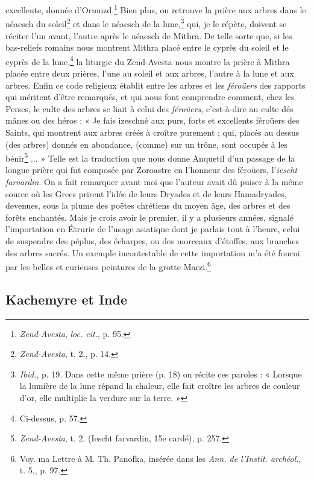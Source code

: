 \documentclass[a4paper, 11pt, oneside, polutonikogreek, french]{article}
\begin{document}
excellente, donnée d'Ormuzd.\footnote{\emph{Zend-Avesta}, \emph{loc. cit.}, p. 95.} Bien plus, on retrouve la prière aux arbres dans le néaesch du soleil\footnote{\emph{Zend-Avesta}, t. 2., p. 14.} et dans le néaesch de la lune,\footnote{\emph{Ibid.}, p. 19. Dans cette même prière (p. 18) on récite ces paroles : « Lorsque la lumière de la lune répand la chaleur, elle fait croître les arbres de couleur d'or, elle multiplie la verdure sur la terre. »} qui, je le répète, doivent se réciter l'un avant, l'autre après le néaesch de Mithra. De telle sorte que, si les bas-reliefs romains nous montrent Mithra placé entre le cyprès du soleil et le cyprès de la lune,\footnote{Ci-dessus, p. 57.} la liturgie du Zend-Avesta nous montre la prière à Mithra placée entre deux prières, l'une au soleil et aux arbres, l'autre à la lune et aux arbres. Enfin ce code religieux établit entre les arbres et les \emph{féroüers} des rapports qui méritent d'être remarqués, et qui nous font comprendre comment, chez les Perses, le culte des arbres se liait à celui des \emph{féroüers}, c'est-à-dire au culte dés mânes ou des héros : « Je fais izeschné aux purs, forts et excellents féroüers des Saints, qui montrent aux arbres créés à croître purement ; qui, placés au dessus (des arbres) donnés en abondance, (comme) sur un trône, sont occupés à les bénir\footnote{\emph{Zend-Avesta}, t. 2. (Iescht farvardin, 15e cardé), p. 257.} ... » Telle est la traduction que nous donne Anquetil d'un passage de la longue prière qui fut composée par Zoroastre en l'honneur des féroüers, l'\emph{iescht farvardin}. On a fait remarquer avant moi que l'auteur avait dû puiser à la même source où les Grecs prirent l'idée de leurs Dryades et de leurs Hamadryades, devenues, sous la plume des poëtes chrétiens du moyen âge, des arbres et des forêts enchantés. Mais je crois avoir le premier, il y a plusieurs années, signalé l'importation en Étrurie de l'usage asiatique dont je parlais tout à l'heure, celui de suspendre des péplus, des écharpes, ou des morceaux d'étoffes, aux branches des arbres sacrés. Un exemple incontestable de cette importation m'a été fourni par les belles et curieuses peintures de la grotte Marzi.\footnote{Voy. ma Lettre à M. Th. Panofka, insérée dans les \emph{Ann. de l'Instit. archéol.}, t. 5., p. 97.}
\clearpage
\subsection{Kachemyre et Inde}
\end{document}
